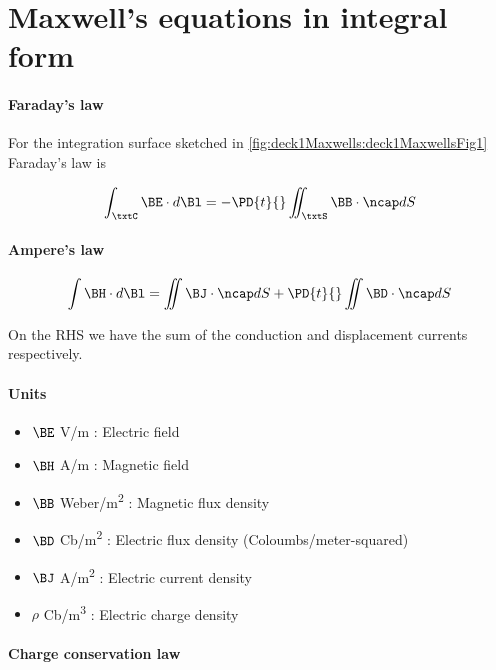 \section{Maxwell's equations in integral form}
\paragraph{Faraday's law}

For the integration surface sketched in \cref{fig:deck1Maxwells:deck1MaxwellsFig1} Faraday's law is


\begin{dmath}\label{eqn:uwavesLecture1:20}
\int_\txtC \BE \cdot d\Bl = - \PD{t}{} \iint_\txtS \BB \cdot \ncap dS
\end{dmath}

\paragraph{Ampere's law}
\begin{dmath}\label{eqn:uwavesLecture1:40}
\int \BH \cdot d\Bl = \iint \BJ \cdot \ncap dS + \PD{t}{} \iint \BD \cdot \ncap dS
\end{dmath}

On the RHS we have the sum of the conduction and displacement currents respectively.

\paragraph{Units}

\begin{itemize}
\item \( \BE \) \si{V/m} : Electric field
\item \( \BH \) \si{A/m} : Magnetic field
\item \( \BB \) \si{Weber/m^2} : Magnetic flux density
\item \( \BD \) \si{Cb/m^2} : Electric flux density (Coloumbs/meter-squared)
\item \( \BJ \) \si{A/m^2} : Electric current density
\item \( \rho \) \si{Cb/m^3} : Electric charge density
\end{itemize}

\paragraph{Charge conservation law}

